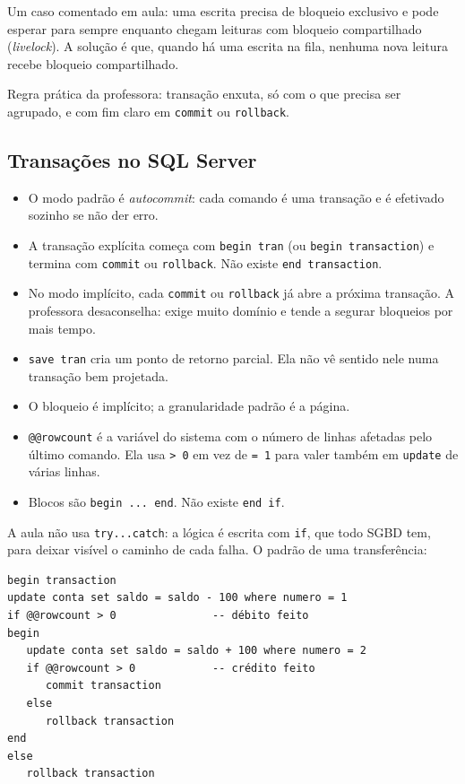 Um caso comentado em aula: uma escrita precisa de bloqueio exclusivo e
pode esperar para sempre enquanto chegam leituras com bloqueio
compartilhado (\emph{livelock}). A solução é que, quando há uma escrita
na fila, nenhuma nova leitura recebe bloqueio compartilhado.

Regra prática da professora: transação enxuta, só com o que precisa ser
agrupado, e com fim claro em \texttt{commit} ou \texttt{rollback}.

\subsection{Transações no SQL Server}

\begin{itemize}
	\item O modo padrão é \emph{autocommit}: cada comando é uma transação
	e é efetivado sozinho se não der erro.
	\item A transação explícita começa com \texttt{begin tran} (ou
	\texttt{begin transaction}) e termina com \texttt{commit} ou
	\texttt{rollback}. Não existe \texttt{end transaction}.
	\item No modo implícito, cada \texttt{commit} ou \texttt{rollback} já
	abre a próxima transação. A professora desaconselha: exige muito
	domínio e tende a segurar bloqueios por mais tempo.
	\item \texttt{save tran} cria um ponto de retorno parcial. Ela não
	vê sentido nele numa transação bem projetada.
	\item O bloqueio é implícito; a granularidade padrão é a página.
	\item \texttt{@@rowcount} é a variável do sistema com o número de
	linhas afetadas pelo último comando. Ela usa \texttt{> 0} em vez de
	\texttt{= 1} para valer também em \texttt{update} de várias linhas.
	\item Blocos são \texttt{begin ... end}. Não existe \texttt{end if}.
\end{itemize}

A aula não usa \texttt{try...catch}: a lógica é escrita com
\texttt{if}, que todo SGBD tem, para deixar visível o caminho de cada
falha. O padrão de uma transferência:

\begin{lstlisting}[caption={Transferência entre contas com \texttt{@@rowcount}.}]
begin transaction
update conta set saldo = saldo - 100 where numero = 1
if @@rowcount > 0               -- débito feito
begin
   update conta set saldo = saldo + 100 where numero = 2
   if @@rowcount > 0            -- crédito feito
      commit transaction
   else
      rollback transaction
end
else
   rollback transaction
\end{lstlisting}

